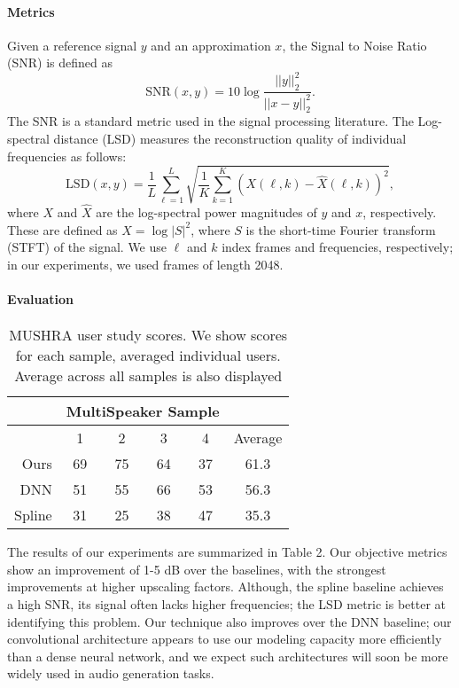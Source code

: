 \documentclass{article} \usepackage{iclr2017_workshop,times}
\begin{document}
\paragraph{Metrics}

Given a reference signal $y$ and an approximation $x$, the Signal to Noise Ratio (SNR) is defined as
\begin{equation}
\text{SNR}(x,y) = 10 \log \frac{|| y ||_2^2}{|| x-y ||_2^2}.
\end{equation}
The SNR is a standard metric used in the signal processing literature.
The Log-spectral distance (LSD) \citep{gray1976distance} measures the reconstruction quality of individual frequencies as follows:
\begin{equation}
\text{LSD}(x,y) = \frac{1}{L} \sum_{\ell=1}^L \sqrt{\frac{1}{K} \sum_{k=1}^K \left( X(\ell, k) - \hat X(\ell, k) \right)^2 }, 
\end{equation}
where $X$ and $\hat X$ are the log-spectral power magnitudes of $y$ and $x$, respectively. These are defined as $ X = \log |S|^2 $, where $S$ is the short-time Fourier transform (STFT) of the signal. We use $\ell$ and $k$ index frames and frequencies, respectively; in our experiments, we used frames of length 2048.

\paragraph{Evaluation} 

\begin{wraptable}{r}{0.5\textwidth}
\vspace{-3mm}
\begin{tabular}{rcccc|c}
& \multicolumn{4}{c}{MultiSpeaker Sample} & \\
\hline
 & 1 & 2 & 3 & 4 & Average \\
\hline
Ours & 69 & 75 & 64 & 37 & 61.3 \\
DNN & 51 & 55 & 66 &  53 & 56.3 \\
Spline & 31 & 25 & 38 & 47 & 35.3 \\
\hline
\end{tabular}
\caption{MUSHRA user study scores. We show scores for each sample, averaged individual users. Average across all samples is also displayed}
\label{mos}
\end{wraptable}

The results of our experiments are summarized in Table 2. Our objective metrics show an improvement of 1-5 dB over the baselines, with the strongest improvements at higher upscaling factors.
Although, the spline baseline achieves a high SNR, its signal often lacks higher frequencies; the LSD metric is better at identifying this problem. 
Our technique also improves over the DNN baseline; our convolutional architecture appears to use our  modeling capacity more efficiently than a dense neural network, and we expect such architectures will soon be more widely used in audio generation tasks.
\end{document}
